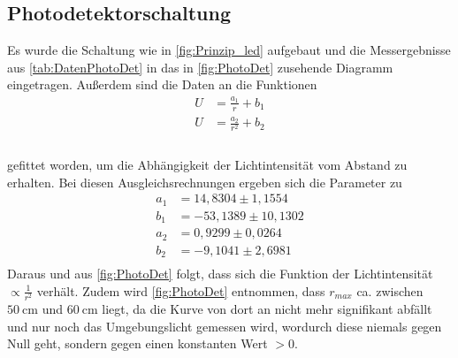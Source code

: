 \subsection{Photodetektorschaltung}
\label{subsec:PhotDet}
Es wurde die Schaltung wie in \autoref{fig:Prinzip_led} aufgebaut und die Messergebnisse aus \autoref{tab:DatenPhotoDet} in das in \autoref{fig:PhotoDet} zusehende Diagramm eingetragen.
Außerdem sind die Daten an die Funktionen
\begin{align*}
    U &= \frac{a_1}{r} + b_1\\
    U &= \frac{a_2}{r^2} + b_2\\
\end{align*}
\\
gefittet worden, um die Abhängigkeit der Lichtintensität vom Abstand zu erhalten. Bei diesen Ausgleichsrechnungen ergeben sich die Parameter zu
\begin{align*}
  a_1 &= 14,8304\pm 1,1554\\
  b_1 &= -53,1389\pm 10,1302\\
  a_2 &= 0,9299\pm 0,0264\\
  b_2 &= -9,1041\pm 2,6981\\
\end{align*}
Daraus und aus \autoref{fig:PhotoDet} folgt, dass sich die Funktion der Lichtintensität $\varpropto \frac{1}{r^2}$ verhält. Zudem wird \autoref{fig:PhotoDet}
entnommen, dass $r_{max}$ ca. zwischen $\SI{50}{\centi\meter}$ und $\SI{60}{\centi\meter}$ liegt, da die Kurve von dort an nicht mehr signifikant abfällt und nur noch
das Umgebungslicht gemessen wird, wordurch diese niemals gegen Null geht, sondern gegen einen konstanten Wert $>0$.
